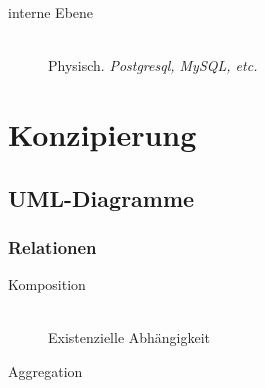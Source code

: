 \begin{multicols}{2}
\begin{description}
		\item[interne Ebene] \hfill \\
			Physisch. \emph{Postgresql, MySQL, etc.}
	\end{description}

\section{Konzipierung}	%
\subsection{UML-Diagramme}

\subsubsection{Relationen}
\begin{description}
	\item[Komposition] \hfill \\
		Existenzielle Abhängigkeit
	\item[Aggregation] \hfill \\
		
\end{description}

\end{multicols}



